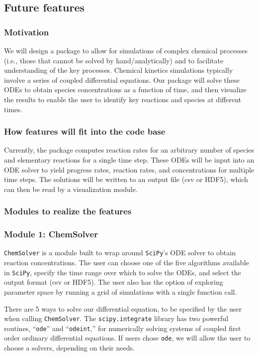 \documentclass[12pt]{article}
\begin{document}
\subsection{Future features}
\subsubsection{Motivation}

We will design a package to allow for simulations of complex chemical processes (i.e., those that cannot be solved by hand/analytically) and to facilitate understanding of the key processes. Chemical kinetics simulations typically involve a series of coupled differential equations. Our package will solve these ODEs to obtain species concentrations as a function of time, and then visualize the results to enable the user to identify key reactions and species at different times.

\subsubsection{How features will fit into the code base}

Currently, the package computes reaction rates for an arbitrary number of species and elementary reactions for a single time step. These ODEs will be input into an ODE solver to yield progress rates, reaction rates, and concentrations for multiple time steps. The solutions will be written to an output file (csv or HDF5), which can then be read by a visualization module. 

\subsubsection{Modules to realize the features}

\subsubsection*{Module 1: ChemSolver}


\texttt{ChemSolver} is a module built to wrap around \texttt{SciPy}'s ODE solver to obtain reaction concentrations. The user can choose one of the five algorithms available in \texttt{SciPy}, specify the time range over which to solve the ODEs, and select the output format (csv or HDF5). The user also has the option of exploring parameter space by running a grid of simulations with a single function call. 

There are 5 ways to solve our differential equation, to be specified by the user when calling \texttt{ChemSolver}. The \texttt{scipy.integrate} library has two powerful routines, “\texttt{ode}” and “\texttt{odeint},” for numerically solving systems of coupled first order ordinary differential equations. If users chose \texttt{ode}, we will allow the user to choose a solvers, depending on their needs.
 
\end{document}
